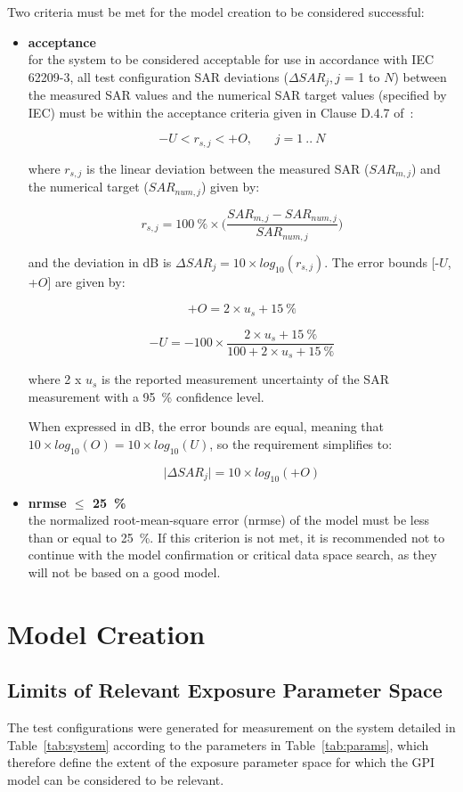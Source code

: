 \documentclass{article}
\begin{document}
Two criteria must be met for the model creation to be considered successful:

\begin{itemize}
\item \textbf{acceptance}\\ for the system to be considered acceptable for use in accordance with IEC 62209-3, all test configuration SAR deviations ($\Delta SAR_j, j$ = 1 to $N$) between the measured SAR values and the numerical SAR target values (specified by IEC) must be within the acceptance criteria given in Clause D.4.7 of~\cite{standard}:

\[
-U < r_{s,j} < +O, ~~~~~~~~ j = 1~..~N
\]

where $r_{s,j}$ is the linear deviation between the measured SAR ($SAR_{m,j}$) and the numerical target ($SAR_{num,j}$) given by:

\[
r_{s,j} = 100~\% \times \Big(\frac{SAR_{m,j} - SAR_{num,j}}{SAR_{num,j}}\Big)
\]

and the deviation in dB is $\Delta SAR_j = 10 \times log_{10} (r_{s,j})$. The error bounds [-$U$, +$O$] are given by:

\[
+O = 2 \times u_s + 15~\%
\]

\[
-U = -100 \times \frac{2 \times u_s + 15~\%}{100 + 2 \times u_s + 15~\%}
\]

where 2 x $u_s$ is the reported measurement uncertainty of the SAR measurement with a 95~\% confidence level.

When expressed in dB, the error bounds are equal, meaning that $10 \times log_{10}(O) = 10 \times log_{10}(U)$, so the requirement simplifies to:

\[
\big|\Delta SAR_j\big| = 10 \times log_{10}(+O)
\]

\item \textbf{nrmse $\le$ 25~\%}\\ the normalized root-mean-square error (nrmse) of the model must be less than or equal to 25~\%. If this criterion is not met, it is recommended not to continue with the model confirmation or critical data space search, as they will not be based on a good model.
\end{itemize}

\section{Model Creation}

\subsection{Limits of Relevant Exposure Parameter Space}
The test configurations were generated for measurement on the system detailed in Table~\ref{tab:system} according to the parameters in Table~\ref{tab:params}, which therefore define the extent of the exposure parameter space for which the GPI model can be considered to be relevant.
\end{document}
